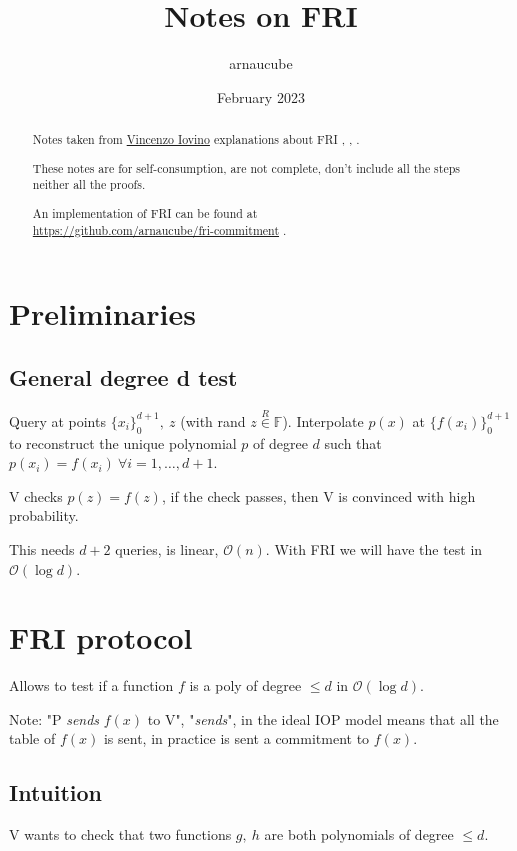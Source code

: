 \documentclass{article}
\title{Notes on FRI}
\author{arnaucube}
\date{February 2023}
\theoremstyle{definition}
\begin{document}
\maketitle

\begin{abstract}
	Notes taken from \href{https://sites.google.com/site/vincenzoiovinoit/}{Vincenzo Iovino} \cite{vincenzoiovino} explanations about FRI \cite{fri}, \cite{cryptoeprint:2022/1216}, \cite{cryptoeprint:2019/1020}.

	These notes are for self-consumption, are not complete, don't include all the steps neither all the proofs.

	An implementation of FRI can be found at\\ \href{https://github.com/arnaucube/fri-commitment}{https://github.com/arnaucube/fri-commitment} \cite{fri-impl}.
\end{abstract}

\tableofcontents

\section{Preliminaries}
\subsection{General degree d test}

Query at points $\{ x_i \}_0^{d+1},~z$ (with rand $z \overset{R}{\in} \mathbb{F}$).
Interpolate $p(x)$ at $\{f(x_i)\}_0^{d+1}$ to reconstruct the unique polynomial $p$ of degree $d$ such that $p(x_i)=f(x_i)~\forall i=1, \ldots, d+1$.

V checks $p(z)=f(z)$, if the check passes, then V is convinced with high probability.

This needs $d+2$ queries, is linear, $\mathcal{O}(n)$. With FRI we will have the test in $\mathcal{O}(\log{}d)$.

\section{FRI protocol}
Allows to test if a function $f$ is a poly of degree $\leq d$ in $\mathcal{O}(\log{}d)$.

Note: "P \emph{sends} $f(x)$ to V", "\emph{sends}", in the ideal IOP model means that all the table of $f(x)$ is sent, in practice is sent a commitment to $f(x)$.

\subsection{Intuition}
V wants to check that two functions $g,~h$ are both polynomials of degree $\leq d$.
\end{document}
